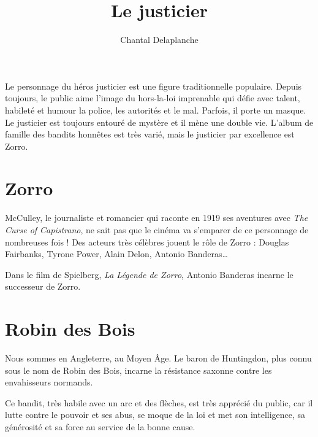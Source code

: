 \documentclass[a5paper,notitlepage]{article}
\author{Chantal Delaplanche}
\title{Le justicier}
\begin{document}
\maketitle
Le personnage du héros justicier est une figure traditionnelle populaire. Depuis toujours, le public aime l'image du
hors-la-loi imprenable qui défie avec talent, habileté et humour la police, les autorités et le mal. Parfois, il porte
un masque. Le justicier est toujours entouré de mystère et il mène une double vie. L'album de famille des bandits
honnêtes est très varié, mais le justicier par excellence est Zorro.

\section{Zorro}
McCulley, le journaliste et romancier qui raconte en 1919 ses aventures avec \emph{The Curse of Capistrano}, ne sait pas que le
cinéma va s'emparer de ce personnage de nombreuses fois ! Des acteurs très célèbres jouent le rôle de Zorro : Douglas Fairbanks,
Tyrone Power, Alain Delon, Antonio Banderas\ldots{}

Dans le film de Spielberg, \emph{La Légende de Zorro}, Antonio Banderas incarne le successeur de Zorro.

\section{Robin des Bois}
Nous sommes en Angleterre, au Moyen Âge. Le baron de Huntingdon, plus connu sous le nom de Robin des Bois, incarne la résistance
saxonne contre les envahisseurs normands.

Ce bandit, très habile avec un arc et des flèches, est très apprécié du public, car il lutte contre le pouvoir et ses abus, se
moque de la loi et met son intelligence, sa générosité et sa force au service de la bonne cause.
\end{document}
